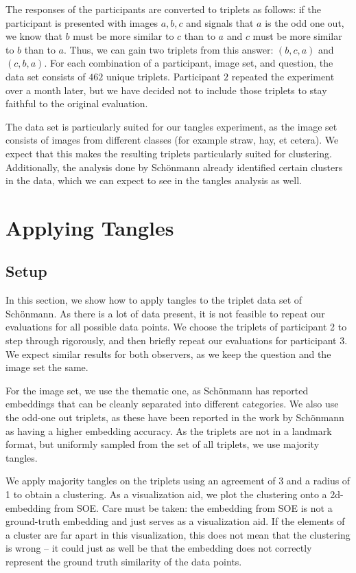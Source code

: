 The responses of the participants are converted to triplets as follows: if the participant is presented with images $a, b, c$ and signals that $a$ is the odd one out, 
we know that $b$ must be more similar to $c$ than to $a$ and $c$ must be more similar to $b$ than to $a$. Thus, we can gain two triplets from this answer: $(b,c,a)$ and $(c,b,a)$.
For each combination of a participant, image set, and question, the data set consists of $462$ unique triplets. 
Participant $2$ repeated the experiment over a month later, but we have decided not to include those triplets to stay faithful to the original evaluation.

The data set is particularly suited for our tangles experiment, as the image set consists of images from different classes (for example straw, hay, et cetera). 
We expect that this makes the resulting triplets particularly suited for clustering. Additionally, the analysis done by Schönmann already identified certain 
clusters in the data, which we can expect to see in the tangles analysis as well.

\section{Applying Tangles}
\subsection{Setup}
In this section, we show how to apply tangles to the triplet data set of Schönmann.
As there is a lot of data present, it is not feasible to repeat our evaluations for all possible data points.
We choose the triplets of participant 2 to step through rigorously, and then briefly repeat our evaluations for participant 3. We expect similar results for both observers,
as we keep the question and the image set the same.

For the image set, we use the thematic one, as Schönmann has reported embeddings that can be cleanly 
separated into different categories.  We also use the odd-one out triplets, as these have been reported in the work by Schönmann as 
having a higher embedding accuracy. As the triplets are not in a landmark format, but uniformly sampled from the set of all triplets, we use majority tangles. 

We apply majority tangles on the triplets using an agreement of 3 and a radius of 1 to obtain a clustering. As a visualization aid, 
we plot the clustering onto a 2d-embedding from SOE. Care must be taken: the embedding
from SOE is not a ground-truth embedding and just serves as a visualization aid. If the elements of a cluster are far 
apart in this visualization, this does not mean that the clustering is wrong – it could just as well be that the embedding does not correctly 
represent the ground truth similarity of the data points.

